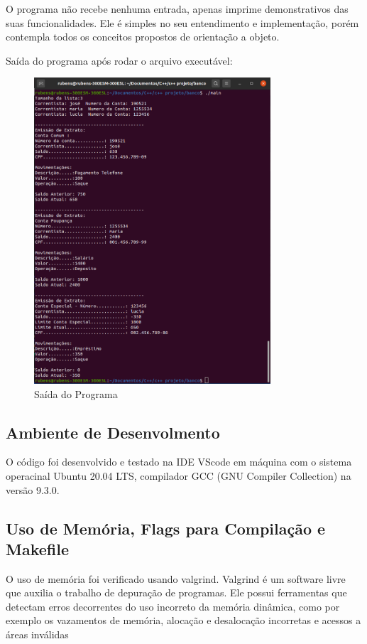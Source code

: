 \documentclass[conference]{IEEEtran}
\begin{document}
    O programa não recebe nenhuma entrada, apenas imprime demonstrativos das suas funcionalidades. Ele é simples no seu entendimento e implementação, porém contempla todos os conceitos propostos de orientação a objeto.

    Saída do programa após rodar o arquivo executável:
    \begin{figure}[htbp]
        \centering
        \includegraphics[width=8.8cm]{../img/exec.png}
        \caption{Saída do Programa}
        \label{fig_programa}
    \end{figure}

    \subsection{Ambiente de Desenvolmento}

    O código foi desenvolvido e testado na IDE VScode em máquina com o sistema operacinal 
    Ubuntu 20.04 LTS, compilador GCC (GNU Compiler Collection) na versão 9.3.0.

    \subsection{Uso de Memória, Flags para Compilação e Makefile}
        O uso de memória foi verificado usando valgrind. Valgrind é um software livre que auxilia o trabalho de depuração de programas. Ele possui ferramentas que detectam erros decorrentes do uso incorreto da memória dinâmica, como por exemplo os vazamentos de memória, alocação e desalocação incorretas e acessos a áreas inválidas
        
\end{document}
